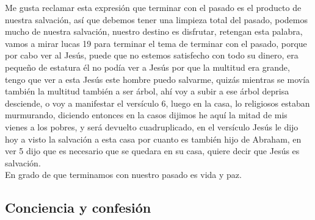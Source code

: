 \documentclass[12pt]{article}
\begin{document}
Me gusta reclamar esta expresión que terminar con el pasado es el producto de nuestra salvación, así que debemos tener una limpieza total del pasado, podemos mucho de nuestra salvación, nuestro destino es disfrutar, retengan esta palabra, vamos a mirar lucas 19 para terminar el tema de terminar con el pasado,  porque por cabo ver al Jesús, puede que no estemos satisfecho con todo su dinero, era pequeño de estatura él no podía ver a Jesús por que la multitud era grande, tengo que ver a esta Jesús este hombre puedo salvarme, quizás mientras se movía también la multitud también a ser árbol, ahí voy a subir a ese árbol deprisa desciende, o voy a manifestar el versículo 6, luego en la casa, lo religiosos estaban murmurando, diciendo entonces en la casos dijimos he aquí la mitad de mis vienes a los pobres, y será devuelto cuadruplicado, en el versículo Jesús le dijo hoy a visto la salvación a esta casa por cuanto es también hijo de Abraham, en ver 5 dijo que es necesario que se quedara en su casa, quiere decir que Jesús es salvación.\\

En grado de que terminamos con nuestro pasado es vida y paz.\\

\subsection*{Conciencia y confesión}
\end{document}
